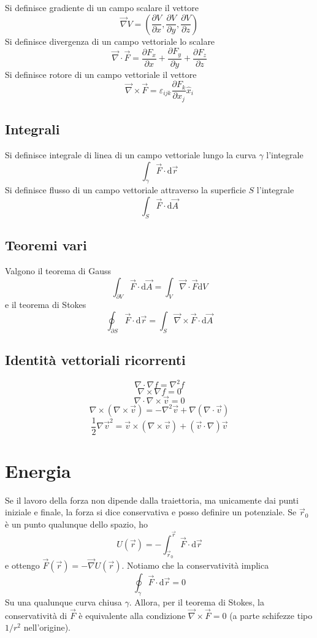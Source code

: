 \documentclass[a4paper,11pt]{article}
\begin{document}
\noindent Si definisce gradiente di un campo scalare il vettore $$\vec{\nabla}V=\left(\frac{\partial V}{\partial x},\frac{\partial V}{\partial y},\frac{\partial V}{\partial z} \right)$$
Si definisce divergenza di un campo vettoriale lo scalare
$$\vec{\nabla}\cdot\vec{F}=\frac{\partial F_x}{\partial x}+\frac{\partial F_y}{\partial y}+\frac{\partial F_z}{\partial z}$$
Si definisce rotore di un campo vettoriale il vettore
$$\vec{\nabla}\times\vec{F}=\varepsilon_{ijk}\frac{\partial F_k}{\partial x_j}\hat{x}_i$$
\subsection{Integrali}

\noindent Si definisce integrale di linea di un campo vettoriale lungo la curva $\gamma$ l'integrale
$$\int_{\gamma}\vec{F}\cdot\mathrm{d}\vec{r}$$
Si definisce flusso di un campo vettoriale attraverso la superficie $S$ l'integrale
$$\int_{S}\vec{F}\cdot\mathrm{d}\vec{A}$$
\subsection{Teoremi vari}

\noindent Valgono il teorema di Gauss
$$\int_{\partial V}\vec{F}\cdot\mathrm{d}\vec{A}=\int_{V}\vec{\nabla}\cdot\vec{F}\mathrm{d}V$$
e il teorema di Stokes
$$\oint_{\partial S}\vec{F}\cdot\mathrm{d}\vec{r}=\int_{S}\vec{\nabla}\times\vec{F}\cdot\mathrm{d}\vec{A}$$

\subsection{Identità vettoriali ricorrenti}
\[\nabla\cdot\nabla f=\nabla^2f\]
\[\nabla\times\nabla f=0\]
\[\nabla\cdot\nabla\times\vec{v}=0\]
\[\nabla\times(\nabla\times\vec{v})=-\nabla^2\vec{v}+\nabla(\nabla\cdot\vec{v})\]
\[\frac{1}{2}\nabla\vec{v}^2=\vec{v}\times(\nabla\times\vec{v})+(\vec{v}\cdot\nabla)\vec{v}\]
\newpage
\section{Energia}
Se il lavoro della forza non dipende dalla traiettoria, ma unicamente dai punti iniziale e finale, la forza si dice conservativa e posso definire un potenziale. Se $\vec{r}_0$ è un punto qualunque dello spazio, ho
$$U(\vec{r})=-\int_{\vec{r}_0}^{\vec{r}}\vec{F}\cdot\mathrm{d}\vec{r}$$
e ottengo $\vec{F}(\vec{r})=-\vec{\nabla}U(\vec{r})$. Notiamo che la conservatività implica
$$\oint_{\gamma}\vec{F}\cdot\mathrm{d}\vec{r}=0$$
Su una qualunque curva chiusa $\gamma$. Allora, per il teorema di Stokes, la conservatività di $\vec{F}$ è equivalente alla condizione $\vec{\nabla}\times\vec{F}=0$ (a parte schifezze tipo $1/r^2$ nell'origine).
\end{document}
